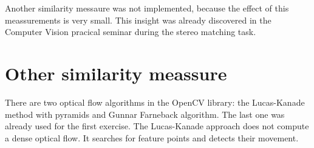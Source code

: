 \documentclass[a4paper]{scrartcl}
\begin{document}
Another similarity messaure was not implemented, because the effect of this meassurements
is very small. This insight was already discovered in the Computer Vision pracical seminar
during the stereo matching task.


\section{Other similarity meassure}

There are two optical flow algorithms in the OpenCV library: the Lucas-Kanade method with pyramids and
Gunnar Farneback algorithm. The last one was already used for the first exercise. The Lucas-Kanade approach
does not compute a dense optical flow. It searches for feature points and detects their movement.
\end{document}
